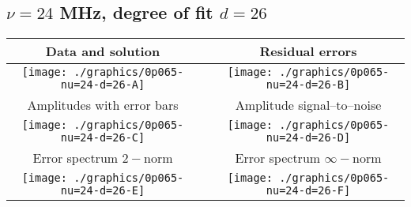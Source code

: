 

% 

\clearpage{}
\break{}

\subsection{$\nu = 24$ MHz, degree of fit $d = 26$}

\begin{table}[h]
    \begin{center}
        \begin{tabular}{ccc}
            Data and solution & \quad & Residual errors \\\hline
            \texttt{[image: ./graphics/0p065-nu=24-d=26-A]} &&
            \texttt{[image: ./graphics/0p065-nu=24-d=26-B]} \\[15pt]
            Amplitudes with error bars && Amplitude signal--to--noise \\\hline
            \texttt{[image: ./graphics/0p065-nu=24-d=26-C]} &&
            \texttt{[image: ./graphics/0p065-nu=24-d=26-D]} \\[15pt]
            Error spectrum $2-$norm && Error spectrum $\infty-$norm \\\hline
            \texttt{[image: ./graphics/0p065-nu=24-d=26-E]} &&
            \texttt{[image: ./graphics/0p065-nu=24-d=26-F]} \\[15pt]
        \end{tabular}
    \end{center}
\label{fig:elev=65, nu=24}
\end{table}



\endinput
